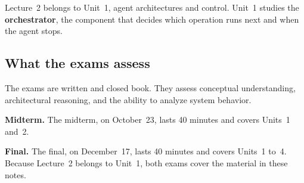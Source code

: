 Lecture~2 belongs to Unit~1, agent architectures and control. Unit~1 studies the
\textbf{orchestrator}, the component that decides which operation runs next and when the agent
stops.

\subsection*{What the exams assess}

The exams are written and closed book. They assess conceptual understanding, architectural
reasoning, and the ability to analyze system behavior.
\bi
\item \textbf{Midterm.} The midterm, on October~23, lasts 40 minutes and covers Units~1 and~2.
\item \textbf{Final.} The final, on December~17, lasts 40 minutes and covers Units~1 to~4.
\ei
Because Lecture~2 belongs to Unit~1, both exams cover the material in these notes.
